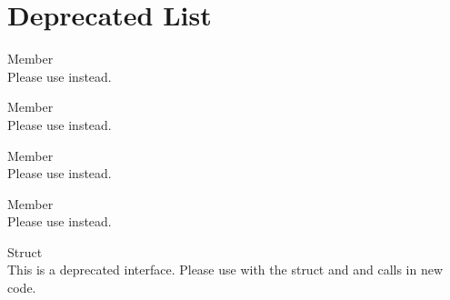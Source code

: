 \chapter{Deprecated List}
\hypertarget{deprecated}{}\label{deprecated}

\begin{DoxyRefList}
\item[Member \doxylink{vorbisenc_8h_a34c3170d227b6368041e59c1dc7ed6e4}{OV\+\_\+\+ECTL\+\_\+\+RATEMANAGE\+\_\+\+AVG} ]\hfill \\
\label{deprecated__deprecated000004}%
%
Please use  instead. 
\item[Member \doxylink{vorbisenc_8h_a614481c0d84bdfbb80eed9208b68f779}{OV\+\_\+\+ECTL\+\_\+\+RATEMANAGE\+\_\+\+GET} ]\hfill \\
\label{deprecated__deprecated000002}%
%
Please use  instead. 
\item[Member \doxylink{vorbisenc_8h_af8869980a805f431af57a50dffbf5d33}{OV\+\_\+\+ECTL\+\_\+\+RATEMANAGE\+\_\+\+HARD} ]\hfill \\
\label{deprecated__deprecated000005}%
%
Please use  instead. 
\item[Member \doxylink{vorbisenc_8h_a1daa1fd8ce1064cce01dde3ad447d389}{OV\+\_\+\+ECTL\+\_\+\+RATEMANAGE\+\_\+\+SET} ]\hfill \\
\label{deprecated__deprecated000003}%
%
Please use  instead. 
\item[Struct \doxylink{structovectl__ratemanage__arg}{ovectl\+\_\+ratemanage\+\_\+arg} ]\hfill \\
\label{deprecated__deprecated000001}%
%
This is a deprecated interface. Please use  with the  struct and  and  calls in new code. 

\end{DoxyRefList}
